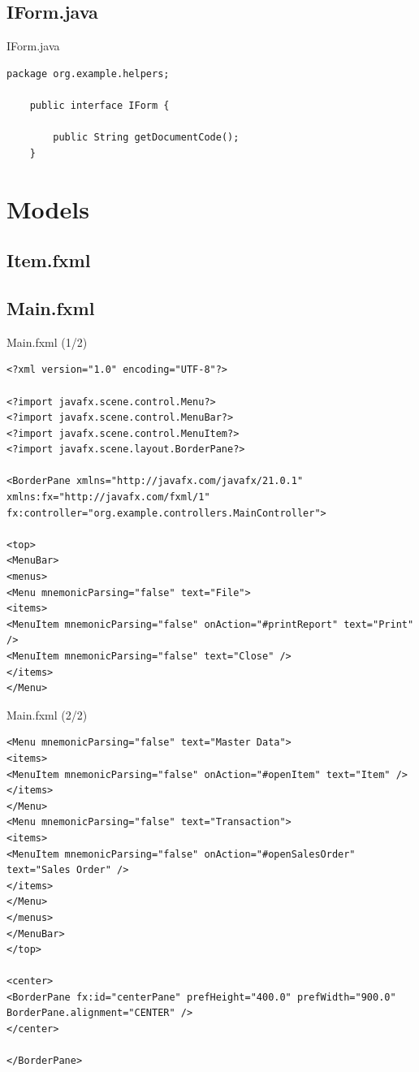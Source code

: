 \documentclass[aspectratio=169, table]{beamer}
\begin{document}
\subsection{IForm.java}
\begin{frame}[fragile]{IForm.java}
\vspace{20pt}
\begin{lstlisting}[style=JavaStyle]
	package org.example.helpers;
	
	public interface IForm {
		
		public String getDocumentCode();
	}
\end{lstlisting}
\end{frame}

\section{Models}	


\subsection{Item.fxml}

\subsection{Main.fxml}

\begin{frame}[fragile]{Main.fxml (1/2)}
\vspace{20pt}
\begin{lstlisting}[style=XmlStyle]
<?xml version="1.0" encoding="UTF-8"?>

<?import javafx.scene.control.Menu?>
<?import javafx.scene.control.MenuBar?>
<?import javafx.scene.control.MenuItem?>
<?import javafx.scene.layout.BorderPane?>

<BorderPane xmlns="http://javafx.com/javafx/21.0.1" xmlns:fx="http://javafx.com/fxml/1" 
fx:controller="org.example.controllers.MainController">

<top>
<MenuBar>
<menus>
<Menu mnemonicParsing="false" text="File">
<items>
<MenuItem mnemonicParsing="false" onAction="#printReport" text="Print" />
<MenuItem mnemonicParsing="false" text="Close" />
</items>
</Menu>
\end{lstlisting}
\end{frame}

\begin{frame}[fragile]{Main.fxml (2/2)}
\vspace{20pt}
\begin{lstlisting}[style=XmlStyle]
<Menu mnemonicParsing="false" text="Master Data">
<items>
<MenuItem mnemonicParsing="false" onAction="#openItem" text="Item" />
</items>
</Menu>
<Menu mnemonicParsing="false" text="Transaction">
<items>
<MenuItem mnemonicParsing="false" onAction="#openSalesOrder" text="Sales Order" />
</items>
</Menu>
</menus>
</MenuBar>
</top>

<center>
<BorderPane fx:id="centerPane" prefHeight="400.0" prefWidth="900.0" 
BorderPane.alignment="CENTER" />
</center>

</BorderPane>
\end{lstlisting}
\end{frame}
\end{document}
